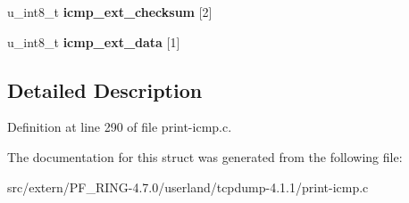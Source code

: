 \begin{DoxyCompactItemize}
\item 
\hypertarget{structicmp__ext__t_a2803246a389efaf5889295464f46f0ee}{
u\_\-int8\_\-t {\bfseries icmp\_\-ext\_\-checksum} \mbox{[}2\mbox{]}}
\label{structicmp__ext__t_a2803246a389efaf5889295464f46f0ee}

\item 
\hypertarget{structicmp__ext__t_a3dc0c9aa45d71f571e825a9f20da7bd6}{
u\_\-int8\_\-t {\bfseries icmp\_\-ext\_\-data} \mbox{[}1\mbox{]}}
\label{structicmp__ext__t_a3dc0c9aa45d71f571e825a9f20da7bd6}

\end{DoxyCompactItemize}


\subsection{Detailed Description}


Definition at line 290 of file print-\/icmp.c.



The documentation for this struct was generated from the following file:\begin{DoxyCompactItemize}
\item 
src/extern/PF\_\-RING-\/4.7.0/userland/tcpdump-\/4.1.1/print-\/icmp.c\end{DoxyCompactItemize}
